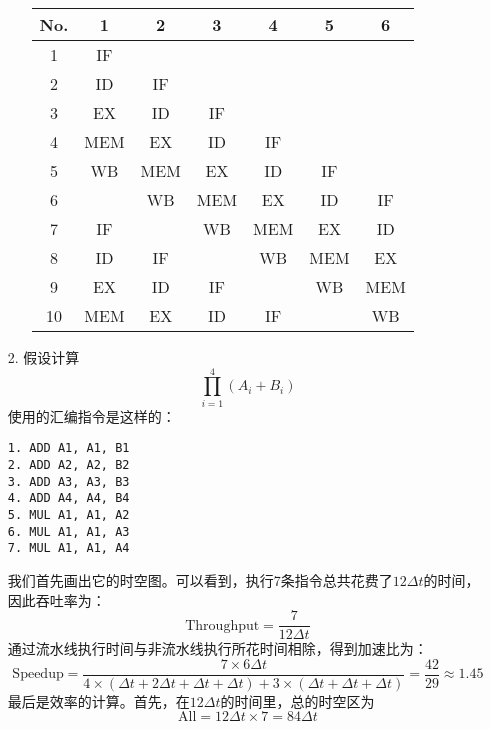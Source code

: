 \documentclass[UTF8,zihao=-4]{ctexart}
\begin{document}
\begin{enumerate}
\begin{enumerate}
			\begin{center}
				\begin{tabular}{|c|c|c|c|c|c|c|}
					\hline
					No. &  1  &  2  &  3  &  4  &  5  &  6  \\ \hline
					 1  & IF  &     &     &     &     &     \\
					 2  & ID  & IF  &     &     &     &     \\
					 3  & EX  & ID  & IF  &     &     &     \\
					 4  & MEM & EX  & ID  & IF  &     &     \\
					 5  & WB  & MEM & EX  & ID  & IF  &     \\
					 6  &     & WB  & MEM & EX  & ID  & IF  \\ \hline
					 7  & IF  &     & WB  & MEM & EX  & ID  \\
					 8  & ID  & IF  &     & WB  & MEM & EX  \\
					 9  & EX  & ID  & IF  &     & WB  & MEM \\
					10  & MEM & EX  & ID  & IF  &     & WB  \\ \hline
				\end{tabular}
			\end{center}
		\end{enumerate}
		\item[2.]假设计算
		\begin{equation*}
			\prod_{i=1}^4\left( A_i+B_i\right)
		\end{equation*}
		使用的汇编指令是这样的：
		\begin{lstlisting}
1. ADD A1, A1, B1
2. ADD A2, A2, B2
3. ADD A3, A3, B3
4. ADD A4, A4, B4
5. MUL A1, A1, A2
6. MUL A1, A1, A3
7. MUL A1, A1, A4
		\end{lstlisting}
		我们首先画出它的时空图。可以看到，执行7条指令总共花费了$12\Delta t$的时间，因此吞吐率为：
		\begin{equation*}
			\text{Throughput}=\frac{7}{12\Delta t}
		\end{equation*}
		通过流水线执行时间与非流水线执行所花时间相除，得到加速比为：
		\begin{equation*}
			\text{Speedup}=\frac{7\times 6\Delta t}{4\times (\Delta t+2\Delta t+\Delta t+\Delta t)+3\times (\Delta t+\Delta t+\Delta t)}=\frac{42}{29}\approx 1.45
		\end{equation*}
		最后是效率的计算。首先，在$12\Delta t$的时间里，总的时空区为
		\begin{equation*}
			\text{All}=12\Delta t\times 7=84\Delta t
		\end{equation*}

\end{enumerate}
\end{document}
